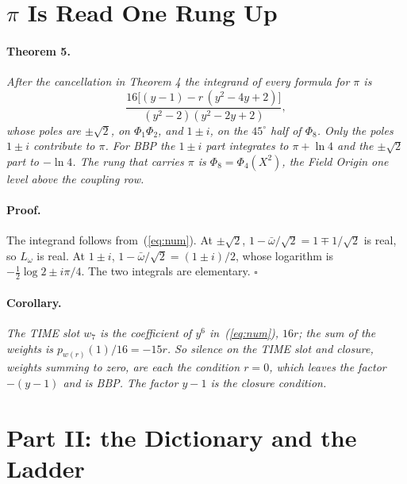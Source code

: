\documentclass[twocolumn]{iopjournal}
\begin{document}

\section*{$\pi$ Is Read One Rung Up}

\paragraph{Theorem 5.} \textit{After the cancellation in Theorem 4
the integrand of every formula for $\pi$ is}
\begin{equation}
  \frac{16\big[(y-1) - r\,(y^2 - 4y + 2)\big]}{(y^2 - 2)(y^2 - 2y + 2)},
  \label{eq:integrand}
\end{equation}
\textit{whose poles are $\pm\sqrt2$, on $\Phi_1\Phi_2$, and $1 \pm i$,
on the $45^\circ$ half of $\Phi_8$. Only the poles $1 \pm i$
contribute to $\pi$. For BBP the $1 \pm i$ part integrates to
$\pi + \ln 4$ and the $\pm\sqrt2$ part to $-\ln 4$. The rung that
carries $\pi$ is $\Phi_8 = \Phi_4(X^2)$, the Field Origin one level
above the coupling row.}

\paragraph{Proof.} The integrand follows from~(\ref{eq:num}). At
$\pm\sqrt2$, $1 - \bar\omega/\sqrt2 = 1 \mp 1/\sqrt2$ is real, so
$L_\omega$ is real. At $1 \pm i$, $1 - \bar\omega/\sqrt2 =
(1 \pm i)/2$, whose logarithm is $-\tfrac12\log 2 \pm i\pi/4$. The
two integrals are elementary. \hfill $\square$

\paragraph{Corollary.} \textit{The TIME slot $w_7$ is the coefficient
of $y^6$ in~(\ref{eq:num}), $16r$; the sum of the weights is
$p_{w(r)}(1)/16 = -15r$. So silence on the TIME slot and closure,
weights summing to zero, are each the condition $r = 0$, which
leaves the factor $-(y-1)$ and is BBP. The factor $y - 1$ is the
closure condition.}


\section*{Part II: the Dictionary and the Ladder}
\end{document}
